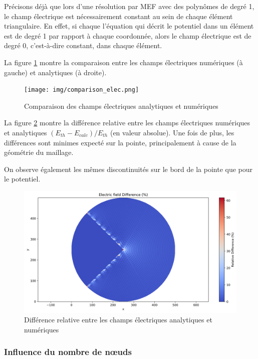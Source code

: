 \documentclass{article}
\begin{document}
Précisons déjà que lors d'une résolution par MEF avec des polynômes
de degré 1, le champ électrique est nécessairement constant
au sein de chaque élément triangulaire. En effet, si chaque
l'équation qui décrit le potentiel dans un élément est de degré 1
par rapport à chaque coordonnée, alors le champ électrique
est de degré 0, c'est-à-dire constant, dans chaque élément.

\newpage

La figure \ref{fig:field_comparison} montre la comparaison
entre les champs électriques
numériques (à gauche) et analytiques (à droite).


\begin{figure}[!h]
    \centering
    \texttt{[image: img/comparison\_elec.png]}
    \caption{Comparaison des champs électriques analytiques et numériques}
    \label{fig:field_comparison}
\end{figure}

La figure \ref{fig:field_diff} montre la différence relative entre
les champs électriques numériques et analytiques
$(E_{th} - E_{calc}) / E_{th}$ (en valeur absolue). Une fois
de plus, les différences sont minimes expecté sur la pointe,
principalement à cause de la géométrie du maillage.

On observe également les mêmes discontinuités sur le bord
de la pointe que pour le potentiel.

\begin{figure}[!h]
    \centering
    \includegraphics[scale=0.5]{img/difference_elec.png}
    \caption{Différence relative entre les champs électriques analytiques et numériques}
    \label{fig:field_diff}
\end{figure}

\newpage

\subsubsection{Influence du nombre de nœuds}
\end{document}

